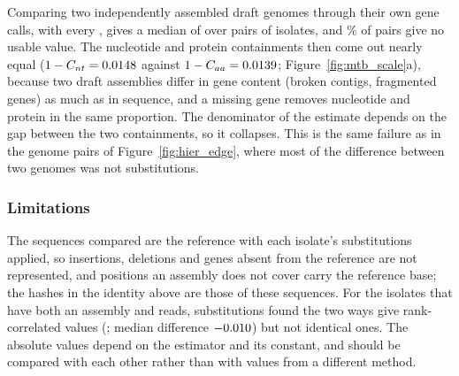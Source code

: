 Comparing two independently assembled draft genomes through their own gene calls, with every \kmer,
gives a median of \mtbAssemblyMedianDnds{} over \mtbSmokePairs{} pairs of \mtbSmokeIsolates{}
isolates, and \mtbAssemblyUnusable\% of pairs give no usable value. The nucleotide and protein
containments then come out nearly equal ($1 - C_{nt} = 0.0148$ against
$1 - C_{aa} = 0.0139$; Figure~\ref{fig:mtb_scale}a), because two draft assemblies differ in
gene content (broken contigs, fragmented genes) as much as in sequence, and a missing gene removes
nucleotide and protein \kmers in the same proportion. The denominator of the estimate depends on the
gap between the two containments, so it collapses. This is the same failure as in the genome pairs of
Figure~\ref{fig:hier_edge}, where most of the difference between two genomes was not substitutions.

\subsubsection*{Limitations}

The sequences compared are the reference with each isolate's substitutions applied, so insertions,
deletions and genes absent from the reference are not represented, and positions an assembly does not
cover carry the reference base; the hashes in the identity above are those of these sequences. For the
\mtbReadsAssemblyIsolates{} isolates that have both an assembly and reads, substitutions found the two
ways give rank-correlated values (\mtbReadsAssemblySpearman{}; median difference
$-0.010$) but not identical ones. The absolute values depend on the estimator and its
constant, and should be compared with each other rather than with values from a different method.
